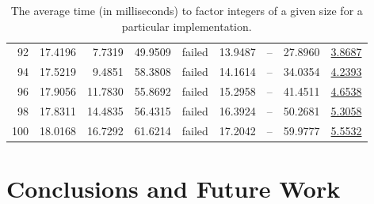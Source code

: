 \documentclass{ucalgthes1}
\theoremstyle{definition}
\begin{document}
\begin{table}[htb]
\begin{tabular}{| r | r | r | r | r | r | r | r | r |}
92 & 17.4196 & 7.7319 & 49.9509 & failed & 13.9487 & -- & 27.8960 & \underline{3.8687} \\
94 & 17.5219 & 9.4851 & 58.3808 & failed & 14.1614 & -- & 34.0354 & \underline{4.2393} \\
96 & 17.9056 & 11.7830 & 55.8692 & failed & 15.2958 & -- & 41.4511 & \underline{4.6538} \\
98 & 17.8311 & 14.4835 & 56.4315 & failed & 16.3924 & -- & 50.2681 & \underline{5.3058} \\
100 & 18.0168 & 16.7292 & 61.6214 & failed & 17.2042 & -- & 59.9777 & \underline{5.5532} \\
	\hline
\end{tabular}
\caption[Average time to factor]{The average time (in milliseconds) to factor integers of a given size for a particular implementation.}
\label{tab:factoringTimes}
\end{table}

\clearpage

\chapter{Conclusions and Future Work}
\end{document}
